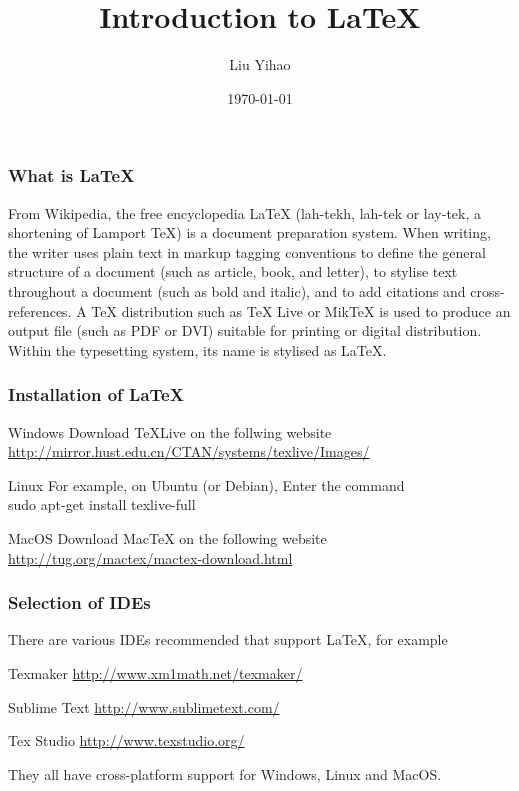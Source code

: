\documentclass{beamer}
\title{Introduction to \LaTeX}
\author{Liu Yihao}
\date{\today}
\begin{document}
\begin{frame}
	\titlepage	
\end{frame}

\begin{frame}
	\frametitle{What is \LaTeX}
	\begin{block}{From Wikipedia, the free encyclopedia}
		LaTeX (lah-tekh, lah-tek or lay-tek, a shortening of Lamport TeX) is a document preparation system. When writing, the writer uses plain text in markup tagging conventions to define the general structure of a document (such as article, book, and letter), to stylise text throughout a document (such as bold and italic), and to add citations and cross-references. A TeX distribution such as TeX Live or MikTeX is used to produce an output file (such as PDF or DVI) suitable for printing or digital distribution. Within the typesetting system, its name is stylised as \LaTeX.
	\end{block}
\end{frame}

\begin{frame}
	\frametitle{Installation of \LaTeX}
	\begin{block}{Windows}
		Download TeXLive on the follwing website\\
		\href{http://mirror.hust.edu.cn/CTAN/systems/texlive/Images/}{\color{blue}http://mirror.hust.edu.cn/CTAN/systems/texlive/Images/}
	\end{block}
	\begin{block}{Linux}
		For example, on Ubuntu (or Debian), Enter the command\\
		sudo apt-get install texlive-full
	\end{block}
	\begin{block}{MacOS}
		Download MacTeX on the following website\\
		\href{http://tug.org/mactex/mactex-download.html}
		{\color{blue}http://tug.org/mactex/mactex-download.html}
	\end{block}
\end{frame}

\begin{frame}
	\frametitle{Selection of IDEs}
	There are various IDEs recommended that support \LaTeX , for example\\
	\begin{block}{Texmaker}
		\href{http://www.xm1math.net/texmaker/}{\color{blue}http://www.xm1math.net/texmaker/}
	\end{block}
	\begin{block}{Sublime Text}
		\href{http://www.sublimetext.com/}{\color{blue}http://www.sublimetext.com/}
	\end{block}
	\begin{block}{Tex Studio}
		\href{http://www.texstudio.org/}{\color{blue}http://www.texstudio.org/}
	\end{block}
	They all have cross-platform support for Windows, Linux and MacOS.
\end{frame}
\end{document}
